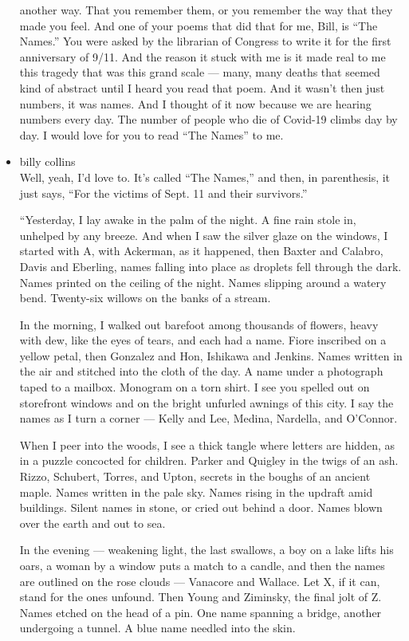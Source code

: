 \begin{itemize}
  another way. That you remember them, or you remember the way that they
  made you feel. And one of your poems that did that for me, Bill, is
  ``The Names.'' You were asked by the librarian of Congress to write it
  for the first anniversary of 9/11. And the reason it stuck with me is
  it made real to me this tragedy that was this grand scale --- many,
  many deaths that seemed kind of abstract until I heard you read that
  poem. And it wasn't then just numbers, it was names. And I thought of
  it now because we are hearing numbers every day. The number of people
  who die of Covid-19 climbs day by day. I would love for you to read
  ``The Names'' to me.
\item
  billy collins\\
  Well, yeah, I'd love to. It's called ``The Names,'' and then, in
  parenthesis, it just says, ``For the victims of Sept. 11 and their
  survivors.''

  ``Yesterday, I lay awake in the palm of the night. A fine rain stole
  in, unhelped by any breeze. And when I saw the silver glaze on the
  windows, I started with A, with Ackerman, as it happened, then Baxter
  and Calabro, Davis and Eberling, names falling into place as droplets
  fell through the dark. Names printed on the ceiling of the night.
  Names slipping around a watery bend. Twenty-six willows on the banks
  of a stream.

  In the morning, I walked out barefoot among thousands of flowers,
  heavy with dew, like the eyes of tears, and each had a name. Fiore
  inscribed on a yellow petal, then Gonzalez and Hon, Ishikawa and
  Jenkins. Names written in the air and stitched into the cloth of the
  day. A name under a photograph taped to a mailbox. Monogram on a torn
  shirt. I see you spelled out on storefront windows and on the bright
  unfurled awnings of this city. I say the names as I turn a corner ---
  Kelly and Lee, Medina, Nardella, and O'Connor.

  When I peer into the woods, I see a thick tangle where letters are
  hidden, as in a puzzle concocted for children. Parker and Quigley in
  the twigs of an ash. Rizzo, Schubert, Torres, and Upton, secrets in
  the boughs of an ancient maple. Names written in the pale sky. Names
  rising in the updraft amid buildings. Silent names in stone, or cried
  out behind a door. Names blown over the earth and out to sea.

  In the evening --- weakening light, the last swallows, a boy on a lake
  lifts his oars, a woman by a window puts a match to a candle, and then
  the names are outlined on the rose clouds --- Vanacore and Wallace.
  Let X, if it can, stand for the ones unfound. Then Young and Ziminsky,
  the final jolt of Z. Names etched on the head of a pin. One name
  spanning a bridge, another undergoing a tunnel. A blue name needled
  into the skin.


\end{itemize}
